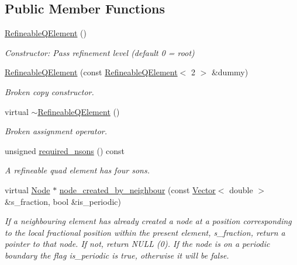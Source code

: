 \subsection*{Public Member Functions}
\begin{DoxyCompactItemize}
\item 
\hyperlink{classoomph_1_1RefineableQElement_3_012_01_4_a86f01d876e3a09794ff05833e35363e4}{Refineable\+Q\+Element} ()
\begin{DoxyCompactList}\small\item\em Constructor\+: Pass refinement level (default 0 = root) \end{DoxyCompactList}\item 
\hyperlink{classoomph_1_1RefineableQElement_3_012_01_4_ae9c291e5a937dbe2fbd849604c1c6adb}{Refineable\+Q\+Element} (const \hyperlink{classoomph_1_1RefineableQElement}{Refineable\+Q\+Element}$<$ 2 $>$ \&dummy)
\begin{DoxyCompactList}\small\item\em Broken copy constructor. \end{DoxyCompactList}\item 
virtual \hyperlink{classoomph_1_1RefineableQElement_3_012_01_4_ac2cd2cdd621bff16699a41edc1f5cb1f}{$\sim$\+Refineable\+Q\+Element} ()
\begin{DoxyCompactList}\small\item\em Broken assignment operator. \end{DoxyCompactList}\item 
unsigned \hyperlink{classoomph_1_1RefineableQElement_3_012_01_4_aac8b41efa9e63826756b390da15644bb}{required\+\_\+nsons} () const
\begin{DoxyCompactList}\small\item\em A refineable quad element has four sons. \end{DoxyCompactList}\item 
virtual \hyperlink{classoomph_1_1Node}{Node} $\ast$ \hyperlink{classoomph_1_1RefineableQElement_3_012_01_4_acf706049e7394cafa3d5f979222b907e}{node\+\_\+created\+\_\+by\+\_\+neighbour} (const \hyperlink{classoomph_1_1Vector}{Vector}$<$ double $>$ \&s\+\_\+fraction, bool \&is\+\_\+periodic)
\begin{DoxyCompactList}\small\item\em If a neighbouring element has already created a node at a position corresponding to the local fractional position within the present element, s\+\_\+fraction, return a pointer to that node. If not, return N\+U\+LL (0). If the node is on a periodic boundary the flag is\+\_\+periodic is true, otherwise it will be false. \end{DoxyCompactList}\item 

\end{DoxyCompactItemize}
